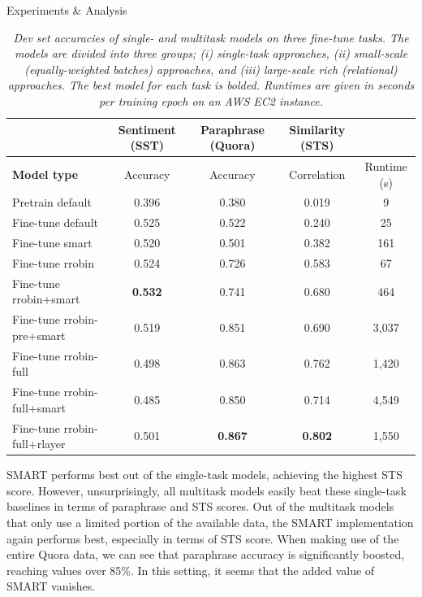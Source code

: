 \documentclass[final]{beamer}
\newlength{\colwidth}
\begin{document}
\begin{frame}[t]
\begin{columns}[t]
\begin{column}{\colwidth}
\begin{block}{Experiments \& Analysis}
\begin{table}[h]
\footnotesize
\centering
\caption{\textit{Dev set accuracies of single- and multitask models on three fine-tune tasks. The models are divided into three groups; (i) single-task approaches, (ii) small-scale (equally-weighted batches) approaches, and (iii) large-scale rich (relational) approaches. The best model for each task is bolded. Runtimes are given in seconds per training epoch on an AWS EC2 instance.}}
\begin{tabular}{|l|cccc|} \hline
& \multicolumn{1}{c}{\textbf{Sentiment (SST)}} & \multicolumn{1}{c}{\textbf{Paraphrase (Quora)}} & \multicolumn{1}{c}{\textbf{Similarity (STS)}} &  \\ \hline
\textbf{Model type} & Accuracy & Accuracy & Correlation & Runtime (s) \\ \hline
Pretrain default      & 0.396         & 0.380            & 0.019 & 9          \\
Fine-tune default      & 0.525        & 0.522           & 0.240 &  25         \\ 
Fine-tune smart        & 0.520             & 0.501           & 0.382 & 161          \\ \hdashline
Fine-tune rrobin       & 0.524            & 0.726            & 0.583   & 67        \\
Fine-tune rrobin+smart & \textbf{0.532}              & 0.741            & 0.680 & 464          \\ \hdashline
Fine-tune rrobin-pre+smart & 0.519          & 0.851           & 0.690 & 3,037         \\
Fine-tune rrobin-full & 0.498          & 0.863           & 0.762 & 1,420         \\ 
Fine-tune rrobin-full+smart & 0.485          & 0.850           & 0.714 & 4,549         \\
Fine-tune rrobin-full+rlayer & 0.501     & \textbf{0.867}         & \textbf{0.802}    & 1,550                 \\ \hline
\end{tabular}
\label{tab: multi}
\end{table}

SMART performs best out of the single-task models, achieving the highest STS score. However, unsurprisingly, all multitask models easily beat these single-task baselines in terms of paraphrase and STS scores. Out of the multitask models that only use a limited portion of the available data, the SMART implementation again performs best, especially in terms of STS score. When making use of the entire Quora data, we can see that paraphrase accuracy is significantly boosted, reaching values over 85\%. In this setting, it seems that the added value of SMART vanishes.  


\end{block}
\end{column}
\end{columns}
\end{frame}
\end{document}
